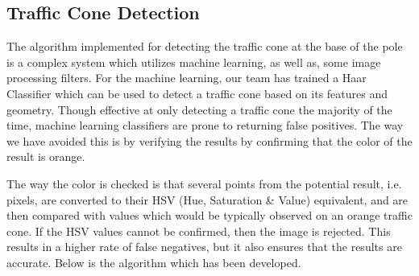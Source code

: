 \documentclass[10pt,letterpaper,onecolumn,draftclsnofoot,journal]{IEEEtran}
\begin{document}
\subsection{\textbf{Traffic Cone Detection}}
The algorithm implemented for detecting the traffic cone at the base of the pole is a complex system which utilizes machine learning, as well as, some image processing filters. For the machine learning, our team has trained a Haar Classifier which can be used to detect a traffic cone based on its features and geometry. Though effective at only detecting a traffic cone the majority of the time, machine learning classifiers are prone to returning false positives. The way we have avoided this is by verifying the results by confirming that the color of the result is orange.\vspace{.3cm}
\par 
The way the color is checked is that several points from the potential result, i.e. pixels, are converted to their HSV (Hue, Saturation \& Value) equivalent, and are then compared with values which would be typically observed on an orange traffic cone. If the HSV values cannot be confirmed, then the image is rejected. This results in a higher rate of false negatives, but it also ensures that the results are accurate. Below is the algorithm which has been developed.
\end{document}
